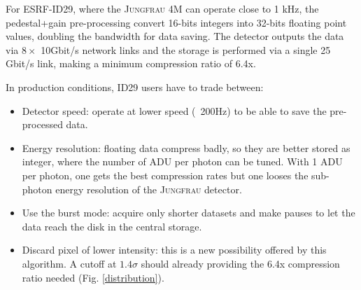 \documentclass[preprint]{iucr}              %
\begin{document}
For ESRF-ID29, where the \textsc{Jungfrau} 4M can operate close to 1 kHz, the pedestal+gain pre-processing convert 16-bits integers into 32-bits floating point values, doubling the bandwidth for data saving.
The detector outputs the data via $8\times$ 10Gbit/s network links and the storage is performed via a single 25 Gbit/s link, making a minimum compression ratio of 6.4x.

In production conditions, ID29 users have to trade between:
\begin{itemize}
    \item Detector speed: operate at lower speed (~200Hz) to be able to save the pre-processed data.
    \item Energy resolution: floating data compress badly, so they are better stored as integer, where the number of ADU per photon can be tuned. With 1 ADU per photon, one gets the best compression rates but one looses the sub-photon energy resolution of the \textsc{Jungfrau} detector.
    \item  Use the burst mode: acquire only shorter datasets and make pauses to let the data reach the disk in the central storage.
    \item Discard pixel of lower intensity: this is a new possibility offered by this algorithm. 
    A cutoff at $1.4\sigma$ should already providing the 6.4x compression ratio needed (Fig. \ref{distribution}).
\end{itemize}
\end{document}
